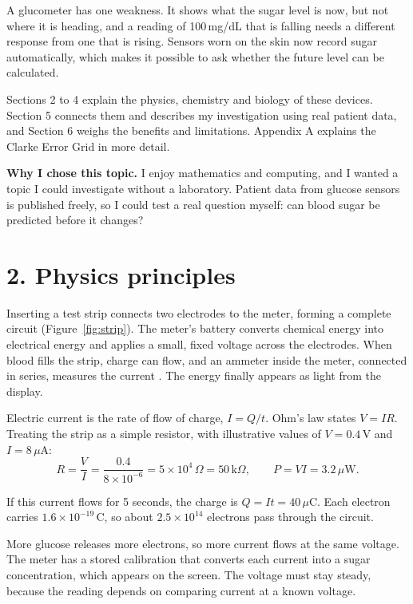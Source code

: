 \documentclass[11pt,a4paper]{article}
\begin{document}
A glucometer has one weakness. It shows what the sugar level is now, but not where it is heading, and a reading of 100\,mg/dL that is falling needs a different response from one that is rising. Sensors worn on the skin now record sugar automatically, which makes it possible to ask whether the future level can be calculated.

Sections 2 to 4 explain the physics, chemistry and biology of these devices. Section 5 connects them and describes my investigation using real patient data, and Section 6 weighs the benefits and limitations. Appendix A explains the Clarke Error Grid in more detail.

\textbf{Why I chose this topic.} I enjoy mathematics and computing, and I wanted a topic I could investigate without a laboratory. Patient data from glucose sensors is published freely, so I could test a real question myself: can blood sugar be predicted before it changes?

\section*{2. Physics principles}

Inserting a test strip connects two electrodes to the meter, forming a complete circuit (Figure~\ref{fig:strip}). The meter's battery converts chemical energy into electrical energy and applies a small, fixed voltage across the electrodes. When blood fills the strip, charge can flow, and an ammeter inside the meter, connected in series, measures the current \cite{wang}. The energy finally appears as light from the display.

Electric current is the rate of flow of charge, $I = Q/t$. Ohm's law states $V = IR$. Treating the strip as a simple resistor, with illustrative values of $V = 0.4$\,V and $I = 8\,\mu$A:
\[
R = \frac{V}{I} = \frac{0.4}{8\times10^{-6}} = 5\times10^{4}\,\Omega = 50\,\text{k}\Omega,
\qquad
P = VI = 3.2\,\mu\text{W}.
\]

If this current flows for 5 seconds, the charge is $Q = It = 40\,\mu$C. Each electron carries $1.6\times10^{-19}$\,C, so about $2.5\times10^{14}$ electrons pass through the circuit.

More glucose releases more electrons, so more current flows at the same voltage. The meter has a stored calibration that converts each current into a sugar concentration, which appears on the screen. The voltage must stay steady, because the reading depends on comparing current at a known voltage.
\end{document}
